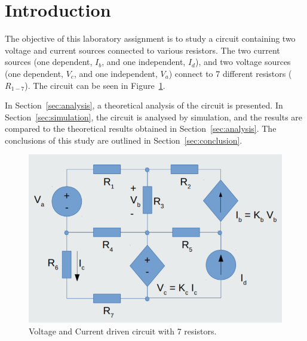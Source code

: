 \section{Introduction}
\label{sec:introduction}


\indent

The objective of this laboratory assignment is to study a circuit containing two voltage and current sources connected to various resistors. The two current sources (one dependent, $I_b$,  and one independent, $I_d$), and two voltage sources (one dependent, $V_c$,  and one independent, $V_a$) connect to 7 different resistors ($R_{1-7}$). The circuit can be seen in Figure~\ref{fig:rc}.



In Section~\ref{sec:analysis}, a theoretical analysis of the circuit is
presented. In Section~\ref{sec:simulation}, the circuit is analysed by
simulation, and the results are compared to the theoretical results obtained in
Section~\ref{sec:analysis}. The conclusions of this study are outlined in
Section~\ref{sec:conclusion}.

\begin{figure}[h] \centering
\includegraphics[width=0.8\linewidth]{Images/Circuit.png}
\caption{Voltage and Current driven circuit with 7 resistors.}
\label{fig:rc}
\end{figure}

